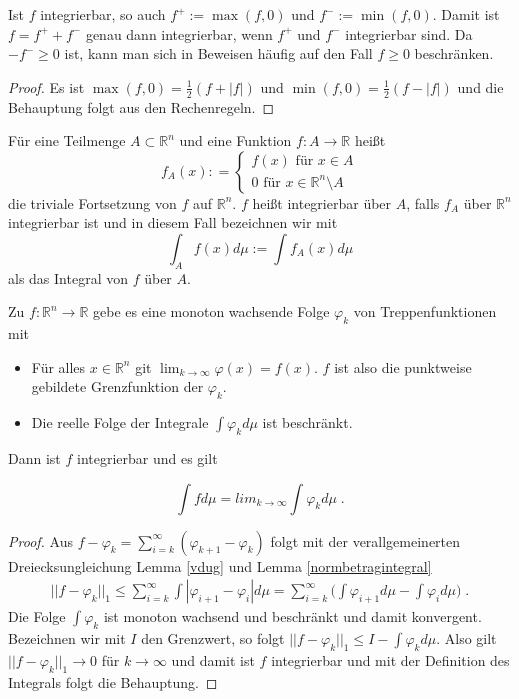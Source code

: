 \begin{Bemerkung}
Ist $f$ integrierbar, so auch $f^+ := \max(f,0)$ und $f^- := \min(f,0)$. Damit ist $f = f^+ + f^-$ genau dann integrierbar, wenn $f^+$ und $f^-$ integrierbar sind. Da $- f^- \geq 0$ ist, kann man sich in Beweisen häufig auf den Fall $f \geq 0$ beschränken.
\end{Bemerkung}
\begin{proof}
Es ist $ \max(f,0) = \frac{1}{2} (f + | f |)$ und  $ \min(f,0) = \frac{1}{2} (f - | f |)$ und die Behauptung folgt aus den Rechenregeln.
\end{proof}

\begin{Definition}
Für  eine Teilmenge $A \subset \mathbb{R}^n$ und eine Funktion $f: A \to \mathbb{R}$ heißt
$$  f_A (x) : = \begin{cases}  f(x) \text{ für } x \in A \\ 0  \text{ für } x \in \mathbb{R}^n \setminus A \end{cases}$$ 
die triviale Fortsetzung von $f$ auf $\mathbb{R}^n$. $f$ heißt integrierbar über $A$, falls $f_A$ über $\mathbb{R}^n$ integrierbar ist und in diesem Fall bezeichnen wir mit $$ \int_A f(x) d \mu := \int f_A (x) d\mu$$ als das Integral von $f$ über $A$.
\end{Definition}




\begin{Satz}
\label{KBL}
Zu $f: \mathbb{R}^n \to \mathbb{R}$ gebe es eine monoton wachsende Folge $\varphi_k$ von Treppenfunktionen mit
\begin{itemize}
\item Für alles $x \in \mathbb{R}^n$ git $\lim_{k \to \infty} \varphi(x) =  f(x)$. $f$ ist also die punktweise gebildete Grenzfunktion der $\varphi_k$.
\item Die reelle Folge der Integrale $\int \varphi_k d \mu $ ist beschränkt.
\end{itemize}
Dann ist $f$ integrierbar und es gilt

$$ \int f d \mu = lim_{k \to \infty}  \int \varphi_k d \mu \; .$$
\end{Satz}

\begin{proof}
Aus $f - \varphi_k = \sum_{i=k}^{\infty} (\varphi_{k+1} - \varphi_k)$ folgt mit der verallgemeinerten Dreiecksungleichung Lemma \ref{vdug}  und Lemma \ref{normbetragintegral}
\begin{align*}
|| f - \varphi_k ||_1 \leq \sum_{i=k}^{\infty} \int | \varphi_{i+1} - \varphi_i | d \mu =  \sum_{i=k}^{\infty} \biggl ( \int  \varphi_{i+1}d \mu -  \int \varphi_i  d \mu \biggr ) \; .
\end{align*}
Die Folge $\int \varphi_k$ ist monoton wachsend und beschränkt und damit konvergent. Bezeichnen wir mit $I$ den Grenzwert, so folgt 
$|| f -\varphi_k ||_1 \leq I - \int \varphi_k d \mu $. Also gilt $|| f -\varphi_k ||_1 \to 0$ für $k \to \infty$ und damit ist $f$ integrierbar und mit der Definition des Integrals folgt die Behauptung.
\end{proof}


